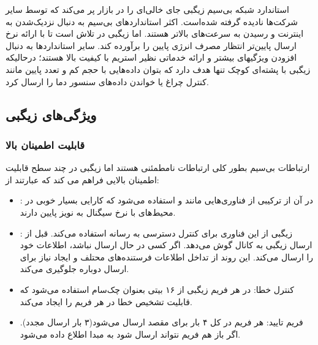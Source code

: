 استاندارد شبکه بی‌سیم زیگبی جای خالی‌ای را در بازار پر می‌کند که توسط سایر شرکت‌ها نادیده گرفته شده‌است. 
اکثر استانداردهای بی‌سیم به دنبال نزدیک‌شدن به اینترنت و رسیدن به سرعت‌های بالاتر هستند. اما زیگبی در تلاش است تا با ارائه نرخ ارسال پایین‌تر انتظار مصرف انرژی پایین را برآورده کند. سایر استانداردها به دنبال افزودن ویژگیهای بیشتر و ارائه خدماتی نظیر استریم با کیفیت بالا هستند؛ درحالیکه زیگبی با پشته‌ای کوچک تنها هدف دارد که بتوان داده‌هایی با حجم کم و تعدد پایین مانند کنترل چراغ یا خواندن داده‌های سنسور دما را ارسال کرد\cite{gislason2008zigbee}.

\subsection{ویژگی‌های زیگبی}

\subsubsection{قابلیت اطمینان بالا}

ارتباطات بی‌سیم بطور کلی ارتباطات نامطمئنی هستند اما زیگبی در چند سطح قابلیت اطمینان بالایی فراهم می کند که عبارتند از:

\begin{itemize}
\item {}: در آن از ترکیبی از فناوری‌هایی مانند  و  استفاده می‌شود که کارایی بسیار خوبی در محیط‌های با نرخ سیگنال به نویز پایین دارند\cite{gislason2008zigbee}.
\item {}: زیگبی از این فناوری برای کنترل دسترسی به رسانه استفاده می‌کند. قبل از ارسال زیگبی به کانال گوش می‌دهد. اگر کسی در حال ارسال نباشد، اطلاعات خود را ارسال می‌کند. این روند از تداخل اطلاعات فرستنده‌های محتلف و ایجاد نیاز برای ارسال دوباره جلوگیری می‌کند\cite{gislason2008zigbee}.
\item کنترل خطا: در هر فریم زیگبی از  ۱۶ بیتی بعنوان چک‌سام استفاده می‌شود که قابلیت تشخیص خطا در هر فریم را ایجاد می‌کند\cite{gislason2008zigbee}.
\item فریم تایید: هر فریم در کل ۴ بار برای مقصد ارسال می‌شود(۳ بار ارسال مجدد). اگر باز هم فریم نتواند ارسال شود به مبدا اطلاع داده می‌شود\cite{gislason2008zigbee}.
\end{itemize}

